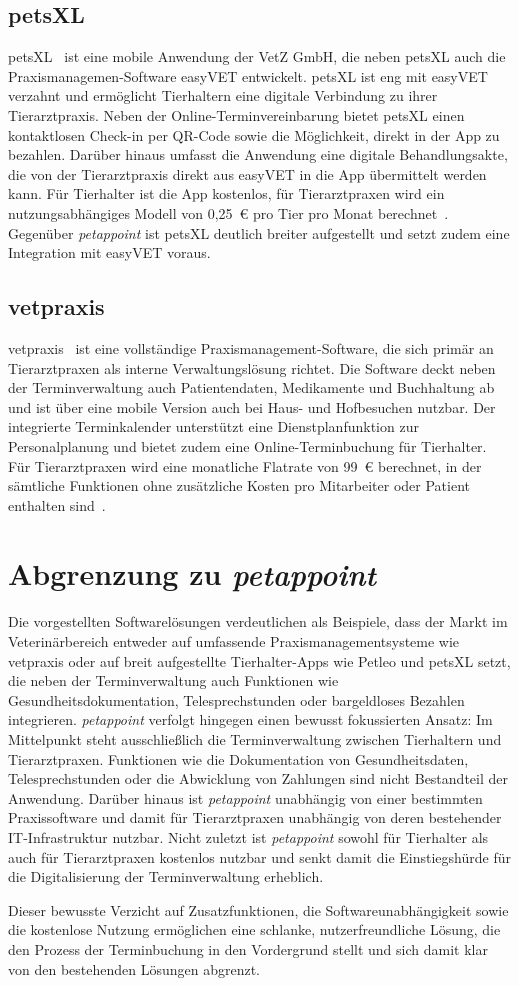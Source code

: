 \subsection{petsXL}
petsXL~\cite{petsxl-info} ist eine mobile Anwendung der VetZ GmbH, die 
neben petsXL auch die Praxismanagemen-Software easyVET entwickelt. 
petsXL ist eng mit easyVET verzahnt und ermöglicht Tierhaltern eine 
digitale Verbindung zu ihrer Tierarztpraxis. Neben der 
Online-Terminvereinbarung bietet petsXL einen kontaktlosen Check-in 
per QR-Code sowie die Möglichkeit, direkt in der App zu bezahlen. 
Darüber hinaus umfasst die Anwendung eine digitale Behandlungsakte, 
die von der Tierarztpraxis direkt aus easyVET in die App übermittelt 
werden kann. Für Tierhalter ist die App kostenlos, für Tierarztpraxen 
wird ein nutzungsabhängiges Modell von 0,25~€ pro Tier pro Monat 
berechnet~\cite{petsxl-info}. Gegenüber \textit{petappoint} ist 
petsXL deutlich breiter aufgestellt und setzt zudem eine Integration 
mit easyVET voraus.

\subsection{vetpraxis}
vetpraxis~\cite{vetpraxis-info} ist eine vollständige 
Praxismanagement-Software, die sich primär an Tierarztpraxen als 
interne Verwaltungslösung richtet. Die Software deckt neben der 
Terminverwaltung auch Patientendaten, Medikamente und Buchhaltung ab 
und ist über eine mobile Version auch bei Haus- und Hofbesuchen 
nutzbar. Der integrierte Terminkalender unterstützt eine 
Dienstplanfunktion zur Personalplanung und bietet zudem eine 
Online-Terminbuchung für Tierhalter. Für Tierarztpraxen wird eine 
monatliche Flatrate von 99~€ berechnet, in der sämtliche Funktionen 
ohne zusätzliche Kosten pro Mitarbeiter oder Patient enthalten 
sind~\cite{vetpraxis-info}.

\section{Abgrenzung zu \textit{petappoint}}
Die vorgestellten Softwarelösungen verdeutlichen als Beispiele, dass der Markt im Veterinärbereich entweder auf umfassende Praxismanagementsysteme wie vetpraxis oder auf breit aufgestellte Tierhalter-Apps wie Petleo und 
petsXL setzt, die neben der Terminverwaltung auch Funktionen wie 
Gesundheitsdokumentation, Telesprechstunden oder bargeldloses Bezahlen 
integrieren. \textit{petappoint} verfolgt hingegen einen bewusst fokussierten Ansatz: Im Mittelpunkt steht ausschließlich die Terminverwaltung zwischen Tierhaltern und Tierarztpraxen. Funktionen wie die Dokumentation von Gesundheitsdaten, Telesprechstunden oder die Abwicklung von Zahlungen sind nicht Bestandteil der Anwendung. Darüber hinaus ist \textit{petappoint} unabhängig von einer bestimmten Praxissoftware und damit für Tierarztpraxen unabhängig von deren bestehender IT-Infrastruktur nutzbar. Nicht zuletzt ist \textit{petappoint} sowohl für Tierhalter als auch für Tierarztpraxen kostenlos nutzbar und senkt damit die Einstiegshürde für die Digitalisierung der Terminverwaltung erheblich.

Dieser bewusste Verzicht auf Zusatzfunktionen, die Softwareunabhängigkeit 
sowie die kostenlose Nutzung ermöglichen eine schlanke, nutzerfreundliche 
Lösung, die den Prozess der Terminbuchung in den Vordergrund stellt 
und sich damit klar von den bestehenden Lösungen abgrenzt.